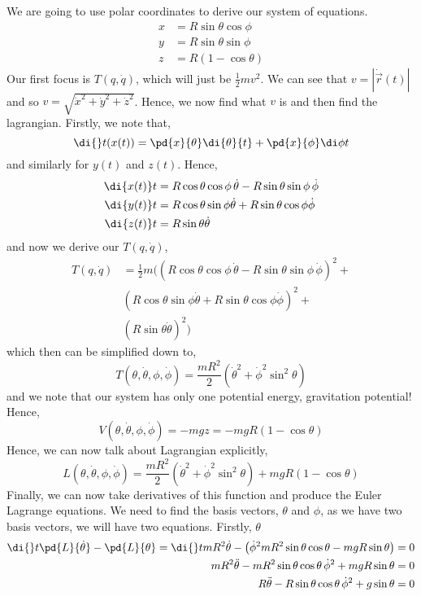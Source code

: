 We are going to use polar coordinates to derive our system of equations.
\begin{align*}
  x &= R\sin \theta \cos\phi \\
  y &= R\sin\theta\sin\phi\\
  z &= R(1 - \cos\theta)
\end{align*}
Our first focus is $T(q, \dot q)$, which will just be $\frac{1}{2}mv^2$. We can see that $v = |\dot{\vec{r}}(t)|$ and so $v = \sqrt{\dot x^2 + \dot y^2 + \dot z^2}$. Hence, we now find what $v$ is and then find the lagrangian. Firstly, we note that,
$$ \di {} t (x(t)) = \pd{x}{\theta}\di {\theta}{t} + \pd{x}{\phi}\di \phi t $$
and similarly for $y(t)$ and $z(t)$. Hence,
\begin{align*}
  \di {x(t)} t &= R\cos \theta \cos \phi \,\dot \theta - R\sin \theta \sin \phi \,\dot \phi\\
  \di {y(t)} t &= R\cos \theta\sin\phi \dot \theta + R\sin \theta\cos \phi \dot \phi\\
  \di {z(t)} t &= R\sin \theta\dot \theta
\end{align*}
and now we derive our $T(q, \dot q)$,
\begin{align*}
  T(q, \dot q) &= \frac{1}{2}m \bigg( \left(R\cos \theta \cos \phi \,\dot \theta - R\sin \theta \sin \phi \,\dot \phi\right)^2 + \\
  & \left(R \cos \theta\sin\phi \dot \theta + R\sin \theta\cos \phi \dot \phi \right)^2 + \\
  & \left( R\sin \theta\dot \theta \right)^2 \bigg)
\end{align*}
which then can be simplified down to,
$$ T(\theta, \dot \theta, \phi, \dot \phi) = \frac{mR^2}{2}\left( \dot \theta^2 + \dot \phi ^2\sin^2 \theta \right) $$
and we note that our system has only one potential energy, gravitation potential! Hence,
$$ V(\theta, \dot \theta, \phi, \dot \phi) = -mgz = -mgR(1 - \cos \theta) $$
Hence, we can now talk about Lagrangian explicitly,
$$ L(\theta, \dot \theta, \phi, \dot \phi) = \frac{mR^2}{2} \left( \dot \theta^2 + \dot\phi^2\sin^2 \theta\right) + mgR\left(1 - \cos \theta\right) $$
Finally, we can now take derivatives of this function and produce the Euler Lagrange equations. We need to find the basis vectors, $\theta$ and $\phi$, as we have two basis vectors, we will have two equations. Firstly, $\theta$
\begin{align*}
  \di {} t \pd{L}{\dot\theta} - \pd{L}{\theta} = \di {} t {mR^2 \dot \theta} - \left( \dot\phi^2mR^2\sin\theta\cos\theta - mgR\sin\theta \right) &= 0\\
  mR^2\ddot{\theta} - mR^2\sin \theta \cos \theta\,\dot \phi^2 + mgR\sin \theta &= 0\\
  R\ddot{\theta} - R\sin \theta \cos \theta\,\dot \phi^2 + g\sin \theta &= 0
\end{align*}
